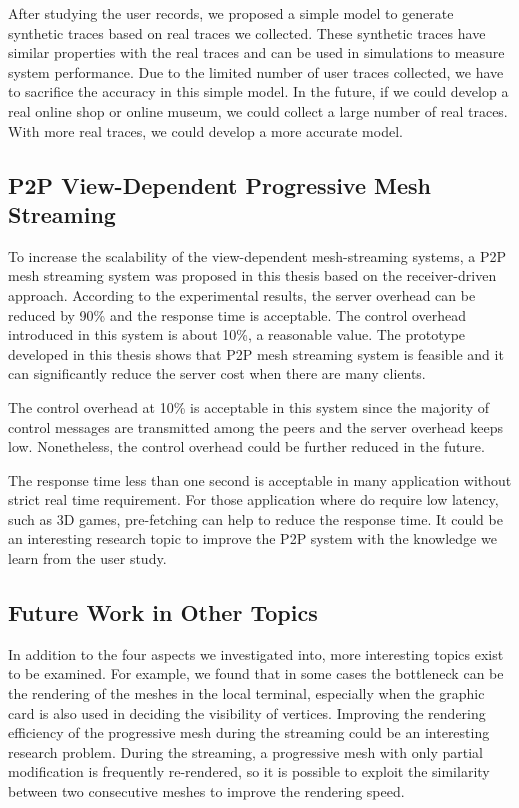 After studying the user records, we proposed a simple model 
to generate synthetic traces based on real traces we collected. 
These synthetic traces have similar properties with the real traces and 
can be used in simulations to measure system performance.
Due to the limited number of user traces collected, we have to 
sacrifice the accuracy in this simple model. In the future, if we could develop a real 
online shop or online museum, we could collect a large number of real traces.
With more real traces, we could develop a more accurate model.

\subsection{P2P View-Dependent Progressive Mesh Streaming}
To increase the scalability of the view-dependent mesh-streaming systems, 
a P2P mesh streaming system was proposed in this thesis based on the receiver-driven approach. 
According to the experimental results, the server overhead can be reduced by 90\%
and the response time is acceptable. %
The control overhead introduced in this system is about 10\%, a reasonable value. 
The prototype developed in this thesis shows that P2P mesh streaming system is feasible
and it can significantly reduce the server cost when there are many clients.

The control overhead at 10\% is acceptable in this system since the majority of
control messages are transmitted among the peers and the server overhead keeps low. 
Nonetheless, the control overhead could be further reduced in the future. 

The response time less than one second is acceptable in many application without 
strict real time requirement. For those application where do require low latency, such
as 3D games, pre-fetching can help to reduce the response time. It could be an interesting 
research topic to improve the P2P system with the knowledge we learn from the user study.

\subsection{Future Work in Other Topics}
In addition to the four aspects we investigated into, more interesting topics exist to be examined.
For example, we found that in some cases the bottleneck can be the rendering of the meshes in the local 
terminal, especially when the graphic card is also used in deciding the visibility of vertices. 
Improving the rendering efficiency of the progressive mesh during the streaming 
could be an interesting research problem.  
During the streaming, a progressive mesh with only partial modification is frequently re-rendered, 
so it is possible to exploit the similarity between two consecutive meshes to improve the rendering speed.

